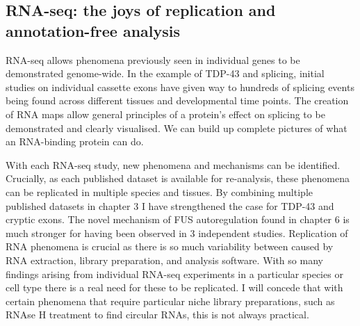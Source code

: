 





\subsection{RNA-seq: the joys of replication and annotation-free analysis}

RNA-seq allows phenomena previously seen in individual genes to be demonstrated genome-wide.
In the example of TDP-43 and splicing, initial studies on individual cassette exons have given way to hundreds of splicing events being found across different tissues and developmental time points.
The creation of RNA maps allow general principles of a protein's effect on splicing to be demonstrated and clearly visualised.
We can build up complete pictures of what an RNA-binding protein can do.

With each RNA-seq study, new phenomena and mechanisms can be identified.
Crucially, as each published dataset is available for re-analysis, these phenomena can be replicated in multiple species and tissues.
By combining multiple published datasets in chapter 3 I have strengthened the case for TDP-43 and cryptic exons.
The novel mechanism of FUS autoregulation found in chapter 6 is much stronger for having been observed in 3 independent studies.
Replication of RNA phenomena is crucial as there is so much variability between caused by RNA extraction, library preparation, and analysis software.
With so many findings arising from individual RNA-seq experiments in a particular species or cell type there is a real need for these to be replicated.
I will concede that with certain phenomena that require particular niche library preparations, such as RNAse H treatment to find circular RNAs, this is not always practical.

